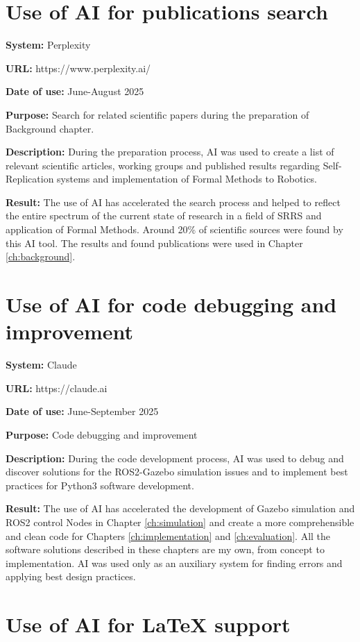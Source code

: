 
\section{Use of AI for publications search}

\textbf{System:} Perplexity

\textbf{URL:} https://www.perplexity.ai/

\textbf{Date of use:} June-August 2025

\textbf{Purpose:} Search for related scientific papers
during the preparation of Background chapter.

\textbf{Description:}
During the preparation process, AI was used to create a list of relevant scientific articles,
working groups and published results regarding Self-Replication systems and
implementation of Formal Methods to Robotics.

\textbf{Result:}
The use of AI has accelerated the search process and helped to reflect the entire spectrum of
the current state of research in a field of SRRS and application of Formal Methods. 
Around 20\% of scientific sources were found by this AI tool.
The results and found publications were used in Chapter \ref{ch:background}.


\section{Use of AI for code debugging and improvement}

\textbf{System:} Claude

\textbf{URL:} https://claude.ai

\textbf{Date of use:} June-September 2025

\textbf{Purpose:} Code debugging and improvement

\textbf{Description:}
During the code development process, AI was used to debug and discover solutions for
the ROS2-Gazebo simulation issues
and to implement best practices  for Python3 software development.

\textbf{Result:}
The use of AI has accelerated the development of Gazebo simulation and ROS2 control
Nodes in Chapter \ref{ch:simulation} and 
create a more comprehensible and clean code for Chapters \ref{ch:implementation} and 
\ref{ch:evaluation}. 
All the software solutions described in these chapters are my own,
from concept to implementation. AI was used only as an auxiliary system 
for finding errors and applying best design practices.


\section{Use of AI for LaTeX support}


